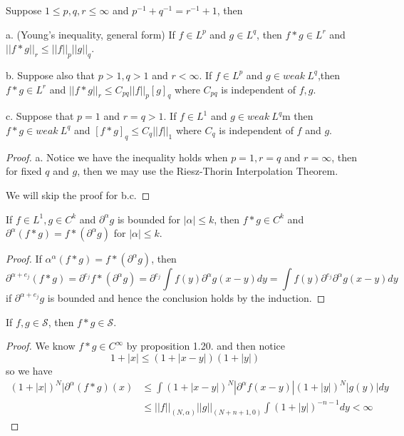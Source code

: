 \documentclass[lang=en, color=blue, ]{elegantbook}
\newcommand{\Sch}{\mathcal{S}}
\begin{document}
\begin{proposition}
    Suppose $1\leq p,q,r \leq \infty$ and $p^{-1}+q^{-1} = r^{-1}+1$, then\par
    a. (Young's inequality, general form) If $f\in L^p$ and $g\in L^q$, then $f*g \in L^r$ and $||f*g||_r \leq ||f||_p||g||_q$.\par
    b. Suppose also that $p>1,q>1$ and $r<\infty$. If $f\in L^p$ and $g\in weak\ L^q$,then $f*g \in L^r$ and $||f*g||_r \leq C_{pq}||f||_p[g]_q$ where $C_{pq}$ is independent of $f,g$.\par
    c. Suppose that $p=1$ and $r= q >1$. If $f\in L^1$ and $g\in weak\ L^q$m then $f*g\in weak\ L^q$ and $[f*g]_q \leq C_q||f||_1$ where $C_q$ is independent of $f$ and $g$.  
\end{proposition}
\begin{proof}\par
    a. Notice we have the inequality holds when $p=1,r=q$ and $r=\infty$, then for fixed $q$ and $g$, then we may use the Riesz-Thorin Interpolation Theorem.\par
    We will skip the proof for b.c.
\end{proof}

\begin{proposition}
    If $f\in L^1,g\in C^k$ and $\partial^{\alpha} g$ is bounded for $|\alpha|\leq k$, then $f*g\in C^k$ and $\partial^{\alpha}(f*g) = f*(\partial^{\alpha} g)$ for $|\alpha| \leq k$.
\end{proposition}
\begin{proof}\par
    If $\alpha^{\alpha}(f*g) = f*(\partial^{\alpha} g)$, then
    \[
    \partial^{\alpha+e_j}(f*g) = \partial^{e_j}f*(\partial^{\alpha} g) = \partial^{e_j}\int f(y)\partial^{\alpha}g(x-y)dy = \int f(y)\partial^{e_j}\partial^{\alpha}g(x-y)dy 
    \]
    if $\partial^{\alpha+e_j} g$ is bounded and hence the conclusion holds by the induction.
\end{proof}

\begin{proposition}
    If $f,g\in \Sch$, then $f*g \in \Sch$.
\end{proposition}
\begin{proof}
    We know $f*g\in C^{\infty}$ by proposition 1.20. and then notice
    \[1+|x| \leq (1+|x-y|)(1+|y|)\]
    so we have
    \[
    \begin{aligned}
    (1+|x|)^N|\partial^{\alpha}(f*g)(x) &\leq \int (1+|x-y|)^N|\partial^{\alpha}f(x-y)|(1+|y|)^N|g(y)|dy \\ &\leq||f||_{(N,\alpha)}||g||_{(N+n+1,0)}\int(1+|y|)^{-n-1}dy < \infty
    \end{aligned}
    \]
\end{proof}
\end{document}
